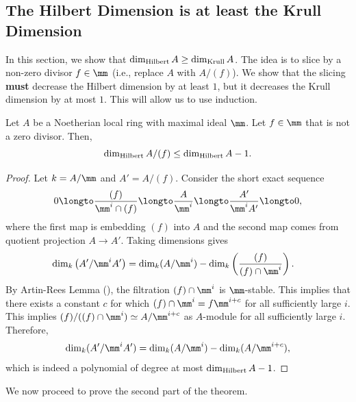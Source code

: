 \subsection{The Hilbert Dimension is at least the Krull Dimension}
\label{subsec:dimH_dimK}
In this section, we show that $\dim_{\text{Hilbert}} A \geq \dim_{\text{Krull}} A$.
The idea is to slice by a non-zero divisor $f\in\mm$
(i.e., replace $A$ with $A/(f)$).
We show that the slicing \textbf{must} decrease 
the Hilbert dimension by at least $1$,
but it decreases the Krull dimension by at most $1$.
This will allow us to use induction.
\begin{lemma}
    \label{lem:hilbert_dim_slicing}
    Let $A$ be a Noetherian local ring with maximal ideal $\mm$.
    Let $f\in\mm$ that is not a zero divisor.
    Then,
    $$\dim_{\text{Hilbert}} A/(f) \leq \dim_{\text{Hilbert}} A - 1.$$
\end{lemma}
\begin{proof}
    Let $k=A/\mm$ and $A'=A/(f)$.
    Consider the short exact sequence
    $$0\longto \frac{(f)}{\mm^i\cap (f)} \longto \frac{A}{\mm^i} 
    \longto \frac{A'}{\mm^iA'}\longto 0,$$
    where the first map is embedding $(f)$ into $A$
    and the second map comes from quotient projection $A\to A'$.
    Taking dimensions gives
    \begin{align*}
    \dim_k\left(A'/\mm^i A'\right) 
    &= \dim_k(A/\mm^i) - \dim_k\left(
    \frac{(f)}{(f)\cap \mm^i}\right).
    \end{align*}
    By Artin-Rees Lemma (),
    the filtration $(f)\cap \mm^i$ is $\mm$-stable.
    This implies that there exists a constant $c$
    for which $(f)\cap \mm^i = f\mm^{i+c}$
    for all sufficiently large $i$.
    This implies $(f)/((f)\cap \mm^i) \simeq A/\mm^{i+c}$
    as $A$-module for all sufficiently large $i$.
    Therefore, 
    $$\dim_k(A'/\mm^i A') 
    = \dim_k(A/\mm^i) - \dim_k(A/\mm^{i+c}),$$
    which is indeed a polynomial of degree at most 
    $\dim_{\text{Hilbert}} A-1$.
\end{proof}
We now proceed to prove the second part of the theorem.
